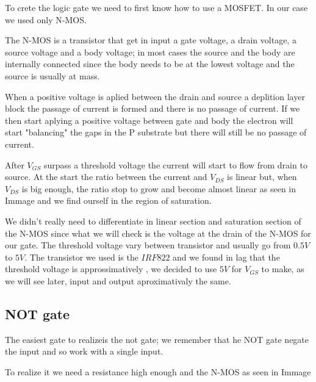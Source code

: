 \documentclass{article}
\begin{document}
To crete the logic gate we need to first know how to use a MOSFET. In our case we used only N-MOS. 

\vspace{3mm}

The N-MOS is a transistor that get in input a gate voltage, a drain voltage, a source voltage and a body voltage; in most cases the source and the body are internally connected since the body needs to be at the lowest voltage and the source is usually at mass.

When a positive voltage is aplied between the drain and source a deplition layer block the passage of current is formed and there is no passage of current. 
If we then start aplying a positive voltage between gate and body the electron will start "balancing" the gaps in the P substrate but there will still be no passage of current. 

After $V_{GS}$ surpass a threshold voltage the current will start to flow from drain to source. At the start the ratio between the current and $V_{DS}$ is linear but, when $V_{DS}$ is big enough, the ratio stop to grow and become almost linear as seen in Immage %
and we find ourself in the region of saturation.

\vspace{3mm}

We didn't really need to differentiate in linear section and saturation section of the N-MOS since what we will check is the voltage at the drain of the N-MOS for our gate.
The threshold voltage vary between transistor and usually go from $0.5V$ to $5V$. 
The transistor we used is the $IRF822$ and we found in lag that the threshold voltage is approssimatively %
, we decided to use $5V$ for $V_{GS}$ to make, as we will see later, input and output aproximativaly the same.



\subsection{NOT gate}

The easiest gate to realizeis the not gate; we remember that he NOT gate negate the input and so work with a single input.

To realize it we need a resistance high enough and the N-MOS as seen in Immage%


\vspace{3mm} %
\end{document}
